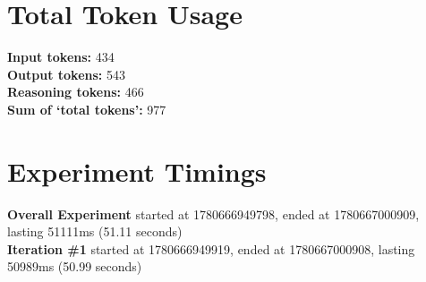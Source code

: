 \documentclass{article}
\begin{document}
\section*{Total Token Usage}
\textbf{Input tokens: }434
\\\textbf{Output tokens: }543
\\\textbf{Reasoning tokens: }466
\\\textbf{Sum of `total tokens': }977
\section*{Experiment Timings}
\textbf{Overall Experiment} started at 1780666949798, ended at 1780667000909, lasting 51111ms (51.11 seconds)
\\\textbf{Iteration \#1} started at 1780666949919, ended at 1780667000908, lasting 50989ms (50.99 seconds)
\end{document}
